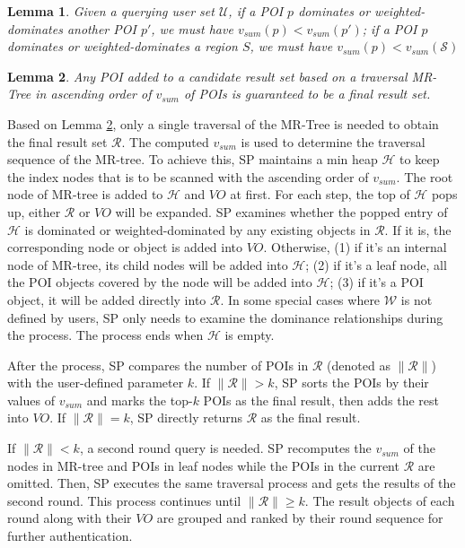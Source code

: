 \documentclass[10pt, conference, compsocconf]{IEEEtran}
\newtheorem{lemma}{Lemma}
\begin{document}
\begin{lemma}\label{Lemma1}
    Given a querying user set $\mathcal{U}$, if a POI $p$ dominates or weighted-dominates another POI $p'$, we must have $v_{sum}(p) < v_{sum}(p')$; if a POI $p$ dominates or weighted-dominates a region $S$, we must have $v_{sum}(p)<v_{sum}(\mathcal{S})$
\end{lemma}

\begin{lemma}\label{Lemma2}
    Any POI added to a candidate result set based on a traversal MR-Tree in ascending order of $v_{sum}$ of POIs is guaranteed to be a final result set.
\end{lemma}

Based on Lemma \ref{Lemma2}, only a single traversal of the MR-Tree is needed to obtain the final result set $\mathcal{R}$. The computed $v_{sum}$ is used to determine the traversal sequence of the MR-tree. To achieve this, SP maintains a min heap $\mathcal{H}$ to keep the index nodes that is to be scanned with the ascending order of $v_{sum}$. The root node of MR-tree is added to $\mathcal{H}$ and $VO$ at first. For each step, the top of $\mathcal{H}$ pops up, either $\mathcal{R}$ or $VO$ will be expanded. SP examines whether the popped entry of $\mathcal{H}$ is dominated or weighted-dominated by any existing objects in $\mathcal{R}$. If it is, the corresponding node or object is added into $VO$. Otherwise, (1) if it's an internal node of MR-tree, its child nodes will be added into $\mathcal{H}$; (2) if it's a leaf node, all the POI objects covered by the node will be added into $\mathcal{H}$; (3) if it's a POI object, it will be added directly into $\mathcal{R}$. In some special cases where $\mathcal{W}$ is not defined by users, SP only needs to examine the dominance relationships during the process. The process ends when $\mathcal{H}$ is empty.

After the process, SP compares the number of POIs in $\mathcal{R}$ (denoted as $\|\mathcal{R}\|$) with the user-defined parameter $k$. If $\|\mathcal{R}\| > k$, SP sorts the POIs by their values of $v_{sum}$ and marks the top-$k$ POIs as the final result, then adds the rest into $VO$. If $\|\mathcal{R}\| = k$, SP directly returns $\mathcal{R}$ as the final result. 

If $\|\mathcal{R}\| < k$, a second round query is needed. SP recomputes the $v_{sum}$ of the nodes in MR-tree and POIs in leaf nodes while the POIs in the current $\mathcal{R}$ are omitted. Then, SP executes the same traversal process and gets the results of the second round. This process continues until $\|\mathcal{R}\| \geq k$. The result objects of each round along with their $VO$ are grouped and ranked by their round sequence for further authentication. 
\end{document}
